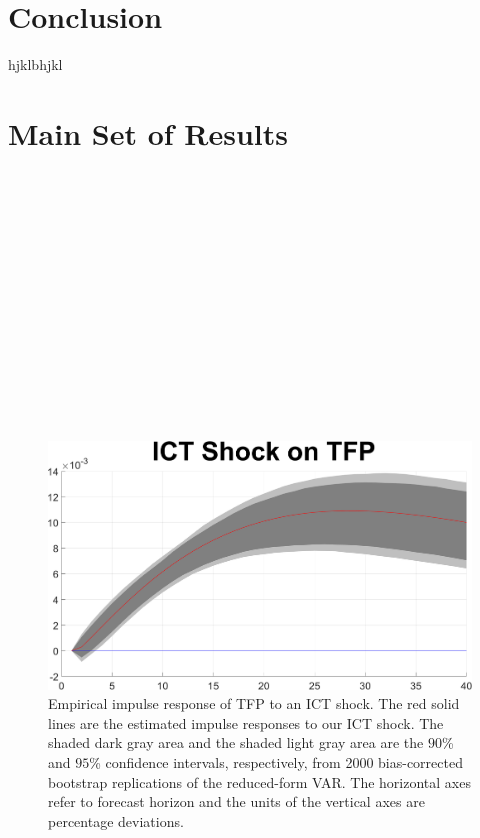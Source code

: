 \documentclass[12pt]{article}
\begin{document}
\section{Conclusion}\label{section:conclusions}
hjklbhjkl





\newpage


\appendix 

\section{Main Set of Results}\label{section:mainSetResults}

\

\

\

\

\

\

\

\

	\begin{figure}[h!]
		\begin{center}
\includegraphics[scale=0.35]{MainFigures/fig_ICT_Shock_on_TFP_empirical_noH}
		\caption{Empirical impulse response of TFP to an ICT shock. The red solid lines are the estimated impulse responses to our ICT shock. The shaded dark gray area and the shaded light gray area are the $90$\% and $95$\% confidence intervals, respectively, from 2000 bias-corrected bootstrap replications of the reduced-form VAR. The horizontal axes refer to forecast horizon and the units of the vertical axes are percentage deviations.}
		\label{fig:TFP_main}
	\end{center}
\end{figure}
\end{document}
